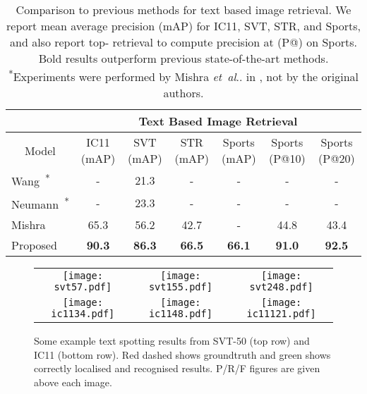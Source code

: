 \documentclass[twocolumn]{svjour3}          \smartqed  \usepackage{epsfig}
\makeatletter
\DeclareRobustCommand\onedot{\futurelet\@let@token\@onedot}
\def\@onedot{\ifx\@let@token.\else.\null\fi\xspace}
\def\etal{\emph{et~al}\onedot}
\makeatother
\begin{document}
\setlength{\tabcolsep}{3pt}
\begin{table*}[t]
\begin{center}
\begin{tabular}[t]{|l||c|c|c|c|c|c|}
\cline{2-7} 
\multicolumn{1}{c|}{\centering ~} & 
\multicolumn{6}{|c|}{\bf Text Based Image Retrieval}\\
\hline
\multicolumn{1}{|c||}{\centering Model} & 
\multicolumn{1}{c|}{\centering IC11 (mAP)} &
\multicolumn{1}{c|}{\centering SVT (mAP)} &
\multicolumn{1}{c|}{\centering STR (mAP)} &
\multicolumn{1}{c|}{\centering Sports (mAP)} &
\multicolumn{1}{c|}{\centering Sports (P@10)}&
\multicolumn{1}{c|}{\centering Sports (P@20)}\\
\hline\hline
Wang~\cite{Wang11}\textsuperscript{*}  & - & 21.3 & - & - & - & -\\
\rowcolor{Gray}
Neumann~\cite{Neumann12}\textsuperscript{*}  & - & 23.3 & - & - & - & -\\
Mishra~\cite{Mishra13}  & 65.3 & 56.2 & 42.7 & - & 44.8 & 43.4\\
\hline
\rowcolor{Gray}
Proposed  & \bf 90.3 & \bf 86.3 & \bf 66.5 & \bf 66.1 & \bf 91.0 & \bf 92.5\\
\hline
\end{tabular}
\end{center}
\vspace*{-1em}
\caption{\small Comparison to previous methods for text based image retrieval. We report mean average precision (mAP) for IC11, SVT, STR, and Sports, and also report top- retrieval to compute precision at  (P@) on Sports. Bold results outperform previous state-of-the-art methods. \textsuperscript{*}Experiments were performed by Mishra \etal in \cite{Mishra13}, not by the original authors.}
\label{table:retrieval}
\end{table*}

\begin{figure*}
\begin{center}
\begin{tabular}{ccc}
\texttt{[image: svt57.pdf]}&
\texttt{[image: svt155.pdf]}&
\texttt{[image: svt248.pdf]}\\
\texttt{[image: ic1134.pdf]}&
\texttt{[image: ic1148.pdf]}&
\texttt{[image: ic11121.pdf]}\\
\end{tabular}
\caption{Some example text spotting results from SVT-50 (top row) and IC11 (bottom row). Red dashed shows groundtruth and green shows correctly localised and recognised results. P/R/F figures are given above each image.}
\label{fig:examples}
\end{center}
\end{figure*}
\end{document}

